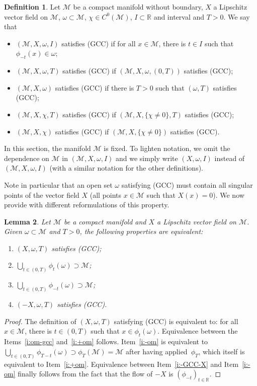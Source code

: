 \documentclass[JEP,XML,SOM,Unicode]{cedram}
\newcommand{\pGCC}{\textup{(GCC)}\xspace}
\newtheorem{lemma}{Lemma}[section]
\theoremstyle{definition}
\newtheorem{definition}[lemma]{Definition}
\newcommand{\M}{\ensuremath{\mathcal M}}
\newcommand{\mb}[1]{\ensuremath{\mathbb{#1}}}
\newcommand{\R}{{\mb{R}}}
\newcommand\bnp{\begin{proof}}
\newcommand\enp{\end{proof}}
\begin{document}
\begin{definition}
\label{d:def-GCC}
Let $\M$ be a compact manifold without boundary, $X$ a Lipschitz vector field on $\M$, $\omega \subset \M$, $\chi \in C^0(\M)$, $I\subset \R$ and interval and $T>0$. We say that
\begin{itemize}
\item $(\M,X, \omega,I)$ satisfies \pGCC if for all $x\in \M$, there is $t \in I$ such that $\phi_{-t}(x)\in \omega$;
\item $(\M,X, \omega,T)$ satisfies \pGCC if $(\M,X, \omega,(0,T))$ satisfies \pGCC;
\item $(\M,X, \omega)$ satisfies \pGCC if there is $T>0$ such that $(\omega,T)$ satisfies \pGCC;
\item $(\M,X, \chi,T)$ satisfies \pGCC if $(\M,X, \{\chi\neq 0\},T)$ satisfies \pGCC;
\item $(\M,X, \chi)$ satisfies \pGCC if $(\M,X, \{\chi\neq 0\})$ satisfies \pGCC.
\end{itemize}
\end{definition}
In this section, the manifold $\M$ is fixed. To lighten notation, we omit the dependence on $\M$ in $(\M,X, \omega,I)$ and we simply write $(X,\omega,I)$ instead of $(\M,X, \omega,I)$ (with a similar notation for the other definitions).

Note in particular that an open set $\omega$ satisfying \pGCC must contain all singular points of the vector field $X$ (\ie all points $x\in \M$ such that $X(x)=0$).
We now provide with different reformulations of this property.\enlargethispage{-\baselineskip}%
\begin{lemma}
\label{l:equiv-GCC}
Let $\M$ be a compact manifold and $X$ a Lipschitz vector field on $\M$.
Given $\omega \subset \M$ and $T>0$, the following properties are equivalent:
\begin{enumerate}
\item \label{i:om-gcc} $(X,\omega,T)$ satisfies \pGCC;
\item \label{i:+om} $\bigcup_{t\in (0,T)}\phi_t(\omega) \supset \M$;
\item \label{i:-om} $\bigcup_{t\in (0,T)}\phi_{-t}(\omega) \supset \M$;
\item \label{i:-GCC-X} $(-X,\omega,T)$ satisfies \pGCC.
\end{enumerate}
\end{lemma}
\bnp
The definition of $(X,\omega,T)$ satisfying \pGCC is equivalent to: for all \hbox{$x\in \M$}, there is $t \in (0,T)$ such that $x \in \phi_t(\omega)$.
Equivalence between the Items~\eqref{i:om-gcc} and~\eqref{i:+om} follows. Item~\eqref{i:-om} is equivalent to $\bigcup_{t\in (0,T)}\phi_{T-t}(\omega) \supset \phi_{T} (\M) = \M$ after having applied~$\phi_T$, which itself is equivalent to Item~\eqref{i:+om}. Equivalence between Item~\eqref{i:-GCC-X} and Item~\eqref{i:-om} finally follows from the fact that the flow of $-X$ is $(\phi_{-t})_{t\in \R}$.
\enp
\end{document}
